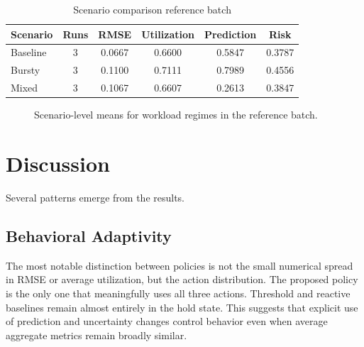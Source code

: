 \documentclass[conference]{IEEEtran}
\begin{document}
\begin{table}[!t]
\caption{Scenario comparison reference batch}
\label{tab:scenario-results}
\centering
\footnotesize
\begin{tabular}{lccccc}
\toprule
\textbf{Scenario} & \textbf{Runs} & \textbf{RMSE} & \textbf{Utilization} & \textbf{Prediction} & \textbf{Risk} \\
\midrule
Baseline & 3 & 0.0667 & 0.6600 & 0.5847 & 0.3787 \\
Bursty & 3 & 0.1100 & 0.7111 & 0.7989 & 0.4556 \\
Mixed & 3 & 0.1067 & 0.6607 & 0.2613 & 0.3847 \\
\bottomrule
\end{tabular}
\end{table}

\begin{figure}[!t]
\centering
{}
\caption{Scenario-level means for workload regimes in the reference batch.}
\label{fig:scenario-bars}
\end{figure}

\section{Discussion}
Several patterns emerge from the results.

\subsection{Behavioral Adaptivity}
The most notable distinction between policies is not the small numerical spread in RMSE or average utilization, but the action distribution. The proposed policy is the only one that meaningfully uses all three actions. Threshold and reactive baselines remain almost entirely in the hold state. This suggests that explicit use of prediction and uncertainty changes control behavior even when average aggregate metrics remain broadly similar.
\end{document}
